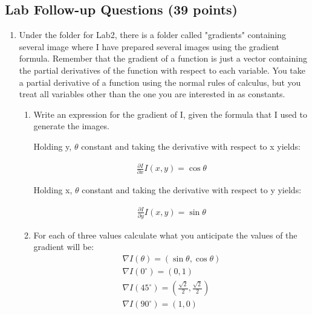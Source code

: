 \documentclass{article}
\begin{document}
\subsection{Lab Follow-up Questions (39 points)}
\begin{enumerate}

\item
Under the folder for Lab2, there is a folder called "gradients" containing several image where I have prepared several images using the gradient formula. Remember that the gradient of a function is just a vector containing the partial derivatives of the function with respect to each variable. You take a partial derivative of a function using the normal rules of calculus, but you treat all variables other than the one you are interested in as constants.


  \begin{enumerate}
    \item Write an expression for the gradient of I, given the formula that I used to generate the images.
    
    Holding y, \(\theta\) constant and taking the derivative with respect to x yields:
    
\begin{eqnarray*}
\frac{\partial I}{\partial x} I(x,y)=\cos \theta
\end{eqnarray*}    
    
        Holding x, \(\theta\)  constant and taking the derivative with respect to y yields:
    
\begin{eqnarray*}[H]
\frac{\partial I}{\partial y} I(x,y)=\sin \theta
\end{eqnarray*}    

    \item For each of three values calculate what you anticipate the values of the gradient will be:
\begin{eqnarray*}
\nabla I \left( \theta \right)=\left( \sin \theta, \cos \theta \right)
\\\nabla I \left( 0 ^{\circ} \right)=\left(0,1\right)
\\\nabla I \left( 45  ^{\circ} \right)=\left(\frac{\sqrt 2}{2},\frac{\sqrt 2}{2}\right)
\\\nabla I \left( 90  ^{\circ} \right)=\left(1,0\right)
\end{eqnarray*}    


\end{enumerate}
\end{enumerate}
\end{document}
